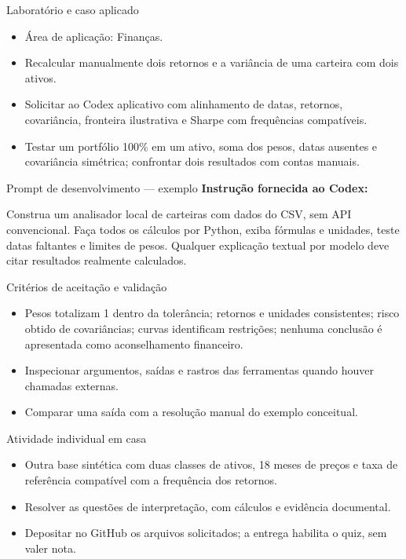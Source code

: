 \documentclass[10pt,aspectratio=169]{beamer}
\begin{document}
\begin{frame}[t]{Laboratório e caso aplicado}
\small
\begin{itemize}
\item Área de aplicação: Finanças.
\item Recalcular manualmente dois retornos e a variância de uma carteira com dois ativos.
\item Solicitar ao Codex aplicativo com alinhamento de datas, retornos, covariância, fronteira ilustrativa e Sharpe com frequências compatíveis.
\item Testar um portfólio 100\% em um ativo, soma dos pesos, datas ausentes e covariância simétrica; confrontar dois resultados com contas manuais.
\end{itemize}
\end{frame}

\begin{frame}[t]{Prompt de desenvolvimento — exemplo}
\small
\small\textbf{Instrução fornecida ao Codex:}\par\vspace{5mm}Construa um analisador local de carteiras com dados do CSV, sem API convencional. Faça todos os cálculos por Python, exiba fórmulas e unidades, teste datas faltantes e limites de pesos. Qualquer explicação textual por modelo deve citar resultados realmente calculados.
\end{frame}

\begin{frame}[t]{Critérios de aceitação e validação}
\small
\begin{itemize}
\item Pesos totalizam 1 dentro da tolerância; retornos e unidades consistentes; risco obtido de covariâncias; curvas identificam restrições; nenhuma conclusão é apresentada como aconselhamento financeiro.
\item Inspecionar argumentos, saídas e rastros das ferramentas quando houver chamadas externas.
\item Comparar uma saída com a resolução manual do exemplo conceitual.
\end{itemize}
\end{frame}

\begin{frame}[t]{Atividade individual em casa}
\small
\begin{itemize}
\item Outra base sintética com duas classes de ativos, 18 meses de preços e taxa de referência compatível com a frequência dos retornos.
\item Resolver as questões de interpretação, com cálculos e evidência documental.
\item Depositar no GitHub os arquivos solicitados; a entrega habilita o quiz, sem valer nota.
\end{itemize}
\end{frame}
\end{document}
